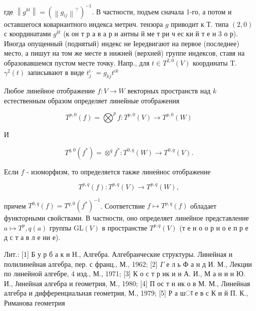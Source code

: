\documentclass[10pt]{article}
\begin{document}
где $\left\|g^{k l}\right\|=\left(\left\|g_{i j}\right\|^{\top}\right)^{-1}$. В частности, подъем сначала 1-го, а потом и оставшегося ковариантного индекса метрич. тензора $g$ приводит к Т. типа $(2,0)$ с координатами $g^{k l}$ (к он т р а в а р и антны й ме т ри ч ес ки й т е н 3 о р). Иногда опущенный (поднятый) индекс не Іередвигают на первое (последнее) место, а пишут на том же месте в нижней (верхней) группе индексов, ставя на образовавшемся пустом месте точку. Напр., для $t \in T^{2,0}(V)$ координаты T. $\gamma^{2}(t)$ записывают в виде $t_{j}^{i \cdot}=g_{k j} t^{i k}$



Любое линейное отображение $f: V \rightarrow W$ векторных пространств над $k$ естественным образом определяет линейные отображения



\[

T^{p, 0}(f)=\bigotimes^{p} f: T^{p, 0}(V) \longrightarrow T^{p, 0}(W)

\]



И



\[

T^{q, 0}\left(f^{*}\right)=\otimes^{q} f^{*}: T^{0, q}(W) \longrightarrow T^{0, q}(V) .

\]



Если $f$ - изоморфизм, то определяется также линеӥнос отображение



\[

T^{p, q}(f): T^{p, q}(V) \longrightarrow T^{p, q}(W),

\]



причем $T^{0, q}(f)=T^{q, 0}\left(f^{*}\right)^{-1}$. Соответствие $f \mapsto T^{p, q}(f)$ обладает функторными свойствами. В частности, оно определяет линейное представление $a \longmapsto T^{p}, q(a)$ группы $\mathrm{GL}(V)$ в пространстве $T^{p, q}(V)$ (т е н $о$ о р н о е п р е д с т а в л е ни е).



Лит.: [1] Б у р б а к и Н., Алгебра. Алгебраические структуры. Линейная и полилинейная алгебра, пер. с франц., М., 1962; [2] $\Gamma$ е л ь Ф а н д И. М., Лекции по линейной алгебре, 4 изд., М., 1971; [3] К о с т р ик и н А. И., М а н и н Ю. И., Јинейная алгебра и геометрия, М., 1980; [4] П ос т н ик о в М. М., Линейная алгебра и дифференциальная геометрия, М., 1979; [5] Р а шा е в с К и й П. К., Риманова геометрия
\end{document}
